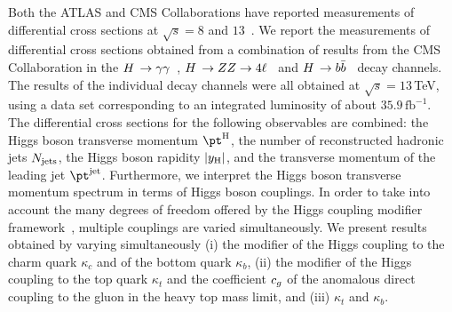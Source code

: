Both the ATLAS and CMS Collaborations have reported measurements of differential cross sections at $\sqrt{s}=8$ and $13$\TeV~\cite{Aad:2014lwa,Khachatryan:2015rxa,Aad:2014tca,Khachatryan:2015yvw,Aad:2016lvc,Khachatryan:2016vnn,Aaboud:2017oem,CMS_AN_2016-442,ATLAS:2018uoi,Aaboud:2018xdt}.
% 
We report the measurements of differential cross sections obtained from a combination of results from the CMS Collaboration in the $H\,\to\gamma\gamma$~\cite{CMS_AN_2017-299}, $H\,\to ZZ \to4\ell$~\cite{CMS_AN_2016-442} and $H\,\to b\bar{b}$~\cite{CMS_AN_2016-366} decay channels.
% 
The results of the individual decay channels were all obtained at $\sqrt{s}=13\,$TeV, using a data set corresponding to an integrated luminosity of about $35.9\,\text{fb}^{-1}$.
% 
The differential cross sections for the following observables are combined: the Higgs boson transverse momentum $\pth$, the number of reconstructed hadronic jets $N_\text{jets}$, the Higgs boson rapidity $\left|y_\text{H}\right|$, and the transverse momentum of the leading jet $\ptjet$.
% 
Furthermore, we interpret the Higgs boson transverse momentum spectrum in terms of Higgs boson couplings.
% 
In order to take into account the many degrees of freedom offered by the Higgs coupling modifier framework~\cite{LHCHiggsCrossSectionWorkingGroup:2012nn}, multiple couplings are varied simultaneously.
% 
We present results obtained by varying simultaneously
% 
(i) the modifier of the Higgs coupling to the charm quark $\kappa_c$ and of the bottom quark $\kappa_b$,
% 
(ii) the modifier of the Higgs coupling to the top quark $\kappa_t$ and the coefficient $c_g$ of the anomalous direct coupling to the gluon in the heavy top mass limit,
% 
and (iii) $\kappa_t$ and $\kappa_b$.



